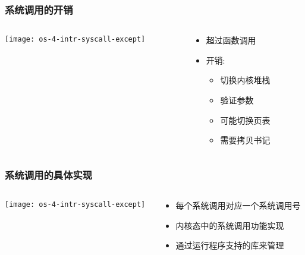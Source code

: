 \begin{frame}
	\frametitle{系统调用的开销}

	\begin{columns}
	
	\begin{column}{0.45\textwidth}
		\centering
		\texttt{[image: os-4-intr-syscall-except]}
		
	\end{column}
	
	\begin{column}{0.5\textwidth}
		
	\begin{itemize}
        \item 超过函数调用
        \item 开销:
	    \begin{itemize}

	        \item 切换内核堆栈
	        \item 验证参数
	        \item 可能切换页表
        	\item 需要拷贝书记

    	\end{itemize}
	\end{itemize}

	\end{column}

\end{columns}

\end{frame}


\begin{frame}[plain]
	\frametitle{系统调用的具体实现}
	\begin{columns}
		
		\begin{column}{0.45\textwidth}
			\centering
			\texttt{[image: os-4-intr-syscall-except]}
			
		\end{column}
		
		\begin{column}{0.5\textwidth}
			
			\begin{itemize}  
				\item 每个系统调用对应一个系统调用号
				\item 内核态中的系统调用功能实现
				\item 通过运行程序支持的库来管理
				
			\end{itemize}
			
		\end{column}
		
	\end{columns}
	
\end{frame}


